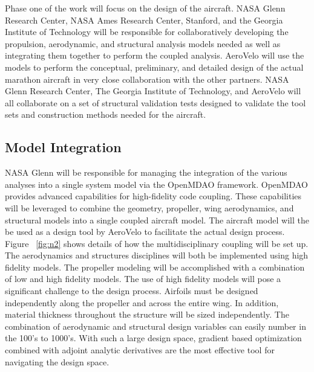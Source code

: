 \documentclass[]{aiaa-tc}
\begin{document}
    Phase one of the work will focus on the design of the aircraft. NASA Glenn Research Center, 
    NASA Ames Research Center, Stanford, and the Georgia Institute of Technology will be responsible 
    for collaboratively developing the propulsion, aerodynamic, and structural analysis 
    models needed as well as integrating them together to perform the coupled analysis. AeroVelo will
    use the models to perform the conceptual, preliminary, and detailed design of the actual marathon 
    aircraft in very close collaboration with the other partners. NASA Glenn Research Center, 
    The Georgia Institute of Technology, and AeroVelo will all collaborate on a set of structural validation 
    tests designed to validate the tool sets and construction methods needed for the aircraft. 

    \subsection{Model Integration}

    NASA Glenn will be responsible for managing the integration of the various analyses into 
    a single system model via the OpenMDAO framework. OpenMDAO provides advanced 
    capabilities for high-fidelity code coupling. These capabilities will be leveraged to combine the geometry,
    propeller, wing aerodynamics, and structural models into a single coupled aircraft model. The aircraft 
    model will the be used as a design tool by AeroVelo to facilitate the actual design process. 
    Figure ~\ref{fig:n2} shows details of how the multidisciplinary coupling will be set up. The aerodynamics 
    and structures disciplines will both be implemented using high fidelity models. The propeller modeling 
    will be accomplished with a combination of low and high fidelity models. The use of high fidelity models 
    will pose a significant challenge to the design process. Airfoils must be designed independently along the propeller and
    across the entire wing. In addition, material thickness throughout the structure
    will be sized independently. The combination of aerodynamic and structural design variables 
    can easily number in the 100's to 1000's. With such a large design space, gradient based optimization 
    combined with adjoint analytic derivatives are the most effective tool for navigating the design space. 
\end{document}
